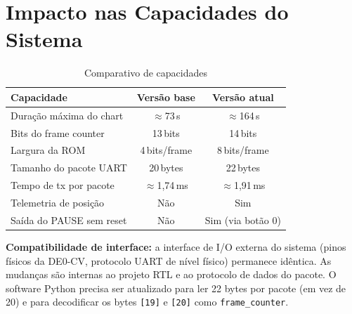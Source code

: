 \documentclass[12pt, a4paper]{article}
\begin{document}
\section{Impacto nas Capacidades do Sistema}

\begin{table}[h!]
\centering
\caption{Comparativo de capacidades}
\label{tab:capacidades}
\begin{tabular}{lcc}
\toprule
\textbf{Capacidade} & \textbf{Versão base} & \textbf{Versão atual} \\
\midrule
Duração máxima do chart      & $\approx$73\,s    & $\approx$164\,s \\
Bits do frame counter        & 13\,bits          & 14\,bits \\
Largura da ROM               & 4\,bits/frame     & 8\,bits/frame \\
Tamanho do pacote UART       & 20\,bytes         & 22\,bytes \\
Tempo de tx por pacote       & $\approx$1,74\,ms & $\approx$1,91\,ms \\
Telemetria de posição        & Não               & Sim \\
Saída do PAUSE sem reset     & Não               & Sim (via botão 0) \\
\bottomrule
\end{tabular}
\end{table}

\vspace{1em}

\begin{destaque}
\textbf{Compatibilidade de interface:} a interface de I/O externa do sistema
(pinos físicos da DE0-CV, protocolo UART de nível físico) permanece idêntica.
As mudanças são internas ao projeto RTL e ao protocolo de dados do pacote.
O software Python precisa ser atualizado para ler 22 bytes por pacote (em vez
de 20) e para decodificar os bytes \texttt{[19]} e \texttt{[20]} como
\texttt{frame\_counter}.
\end{destaque}
\end{document}
